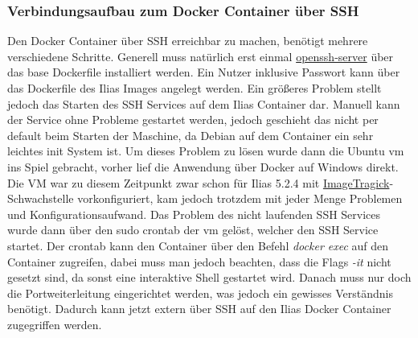 \documentclass[10pt, a4paper,onecolumn ,titlepage]{article}
\begin{document}
    \subsubsection{Verbindungsaufbau zum Docker Container über SSH}
    \label{subsubsec:lessonslearnedDockerSSH}
    Den Docker Container über SSH erreichbar zu machen, benötigt mehrere verschiedene Schritte. Generell muss natürlich erst einmal \href{https://github.com/openssh}{openssh-server} über das base Dockerfile
    installiert werden. Ein Nutzer inklusive Passwort kann über das Dockerfile des Ilias Images angelegt werden. Ein größeres Problem stellt jedoch das Starten des SSH Services auf dem Ilias Container dar.
    Manuell kann der Service ohne Probleme gestartet werden, jedoch geschieht das nicht per default beim Starten der Maschine, da Debian auf dem Container ein sehr leichtes init System ist. Um dieses Problem
    zu lösen wurde dann die Ubuntu \ac{vm} ins Spiel gebracht, vorher lief die Anwendung über Docker auf Windows direkt. Die VM war zu diesem Zeitpunkt zwar schon für Ilias 5.2.4 mit \hyperref[subsubsec:CVE-2016-3714]{ImageTragick}-Schwachstelle
    vorkonfiguriert, kam jedoch trotzdem mit jeder Menge Problemen und Konfigurationsaufwand. Das Problem des nicht laufenden SSH Services wurde dann über den sudo crontab der \ac{vm} gelöst, welcher den SSH Service startet.
    Der crontab kann den Container über den Befehl \textit{docker exec} auf den Container zugreifen, dabei muss man jedoch beachten, dass die Flags \textit{-it} nicht gesetzt sind, da sonst eine interaktive Shell gestartet wird.
    Danach muss nur doch die Portweiterleitung eingerichtet werden, was jedoch ein gewisses Verständnis benötigt. Dadurch kann jetzt extern über SSH auf den Ilias Docker Container zugegriffen werden.
\end{document}
